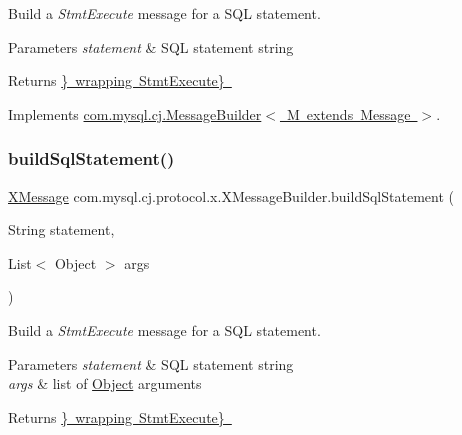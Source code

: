 Build a {\itshape Stmt\+Execute} message for a S\+QL statement.


\begin{DoxyParams}{Parameters}
{\em statement} & S\+QL statement string \\
\hline
\end{DoxyParams}
\begin{DoxyReturn}{Returns}
\mbox{\hyperlink{classcom_1_1mysql_1_1cj_1_1protocol_1_1x_1_1_x_message}{\} wrapping  Stmt\+Execute\} }}
\end{DoxyReturn}


Implements \mbox{\hyperlink{interfacecom_1_1mysql_1_1cj_1_1_message_builder}{com.\+mysql.\+cj.\+Message\+Builder$<$ M extends Message $>$}}.

\mbox{\label{classcom_1_1mysql_1_1cj_1_1protocol_1_1x_1_1_x_message_builder_a2c3993eeb6a20211b7a81f15784fb537}} 
\subsubsection{\texorpdfstring{build\+Sql\+Statement()}{buildSqlStatement()}\hspace{0.1cm}{\footnotesize\ttfamily [2/2]}}
{\footnotesize\ttfamily \mbox{\hyperlink{classcom_1_1mysql_1_1cj_1_1protocol_1_1x_1_1_x_message}{X\+Message}} com.\+mysql.\+cj.\+protocol.\+x.\+X\+Message\+Builder.\+build\+Sql\+Statement (\begin{DoxyParamCaption}\item[{String}]{statement,  }\item[{List$<$ Object $>$}]{args }\end{DoxyParamCaption})}

Build a {\itshape Stmt\+Execute} message for a S\+QL statement.


\begin{DoxyParams}{Parameters}
{\em statement} & S\+QL statement string \\
\hline
{\em args} & list of \mbox{\hyperlink{}{Object}} arguments \\
\hline
\end{DoxyParams}
\begin{DoxyReturn}{Returns}
\mbox{\hyperlink{classcom_1_1mysql_1_1cj_1_1protocol_1_1x_1_1_x_message}{\} wrapping  Stmt\+Execute\} }}
\end{DoxyReturn}


